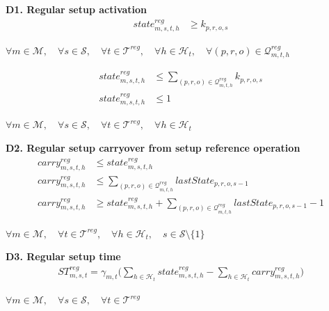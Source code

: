 \documentclass{article}
\begin{document}
\noindent\textbf{D1. Regular setup activation}
\begin{align}
state^{reg}_{m,s,t,h}
&\ge
k_{p,r,o,s}
\label{eq:D1_regular_setup_lb}
\end{align}
\begin{center}
$\forall m \in \mathcal{M}, \quad
\forall s \in \mathcal{S}, \quad
\forall t \in \mathcal{T}^{reg}, \quad
\forall h \in \mathcal{H}_t, \quad
\forall (p,r,o) \in \mathcal{Q}^{reg}_{m,t,h}$
\end{center}

\begin{align}
state^{reg}_{m,s,t,h}
&\le
\sum_{(p,r,o) \in \mathcal{Q}^{reg}_{m,t,h}}
k_{p,r,o,s}
\label{eq:D1_regular_setup_ub}
\\
state^{reg}_{m,s,t,h}
&\le
1
\label{eq:D1_exclusivity}
\end{align}

\begin{center}
$\forall m \in \mathcal{M}, \quad
\forall s \in \mathcal{S}, \quad
\forall t \in \mathcal{T}^{reg}, \quad
\forall h \in \mathcal{H}_t$
\end{center}



\noindent\textbf{D2. Regular setup carryover from setup reference operation}
\begin{align}
carry^{reg}_{m,s,t,h}
&\le
state^{reg}_{m,s,t,h}
\label{eq:D2_regular_carry_current_state}
\\
carry^{reg}_{m,s,t,h}
&\le
\sum_{(p,r,o) \in \mathcal{Q}^{reg}_{m,t,h}}
lastState_{p,r,o,s-1}
\label{eq:D2_regular_carry_reference_ub}
\\
carry^{reg}_{m,s,t,h}
&\ge
state^{reg}_{m,s,t,h}
+
\sum_{(p,r,o) \in \mathcal{Q}^{reg}_{m,t,h}}
lastState_{p,r,o,s-1}
- 1
\label{eq:D2_regular_carry_reference_lb}
\end{align}
\begin{center}
$\forall m \in \mathcal{M}, \quad
\forall t \in \mathcal{T}^{reg}, \quad
\forall h \in \mathcal{H}_t, \quad
s \in \mathcal{S}\setminus\{1\}$
\end{center}



\noindent\textbf{D3. Regular setup time}
\begin{align}
ST^{reg}_{m,s,t}
=
\gamma_{m,t}
\big( \sum_{h \in \mathcal{H}_t}
state^{reg}_{m,s,t,h} - \sum_{h \in \mathcal{H}_t}carry^{reg}_{m,s,t,h} \big)
\label{eq:D3_regular_setup_time}
\end{align}
\begin{center}
$\forall m \in \mathcal{M}, \quad
\forall s \in \mathcal{S}, \quad
\forall t \in \mathcal{T}^{reg}$
\end{center}
\end{document}
